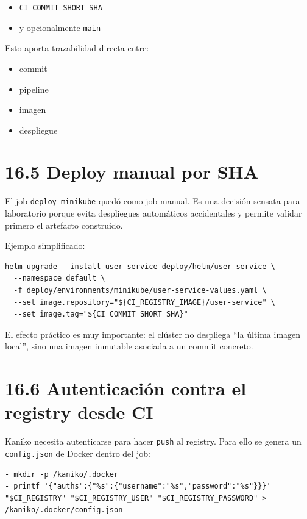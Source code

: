 \documentclass[
a4paper,
12pt]{report}
\providecommand{\tightlist}{%
  \setlength{\itemsep}{0pt}\setlength{\parskip}{0pt}}
\begin{document}
\begin{itemize}
\tightlist
\item
  \texttt{CI\_COMMIT\_SHORT\_SHA}
\item
  y opcionalmente \texttt{main}
\end{itemize}

Esto aporta trazabilidad directa entre:

\begin{itemize}
\tightlist
\item
  commit
\item
  pipeline
\item
  imagen
\item
  despliegue
\end{itemize}

\section{16.5 Deploy manual por SHA}\label{deploy-manual-por-sha}

El job \texttt{deploy\_minikube} quedó como job manual. Es una decisión
sensata para laboratorio porque evita despliegues automáticos
accidentales y permite validar primero el artefacto construido.

Ejemplo simplificado:

\begin{verbatim}
helm upgrade --install user-service deploy/helm/user-service \
  --namespace default \
  -f deploy/environments/minikube/user-service-values.yaml \
  --set image.repository="${CI_REGISTRY_IMAGE}/user-service" \
  --set image.tag="${CI_COMMIT_SHORT_SHA}"
\end{verbatim}

El efecto práctico es muy importante: el clúster no despliega ``la
última imagen local'', sino una imagen inmutable asociada a un commit
concreto.

\section{16.6 Autenticación contra el registry desde
CI}\label{autenticaciuxf3n-contra-el-registry-desde-ci}

Kaniko necesita autenticarse para hacer \texttt{push} al registry. Para
ello se genera un \texttt{config.json} de Docker dentro del job:

\begin{verbatim}
- mkdir -p /kaniko/.docker
- printf '{"auths":{"%s":{"username":"%s","password":"%s"}}}' "$CI_REGISTRY" "$CI_REGISTRY_USER" "$CI_REGISTRY_PASSWORD" > /kaniko/.docker/config.json
\end{verbatim}
\end{document}
